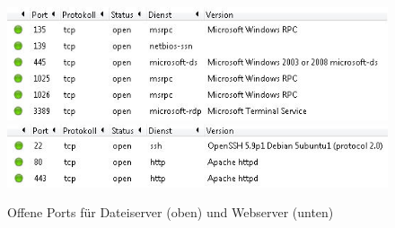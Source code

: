 
\begin{figure}
 \centering
 \includegraphics[width=\textwidth,keepaspectratio=true]{Images/dateiserverports}
 \includegraphics[width=\textwidth,keepaspectratio=true]{Images/webserverports}
 \caption{Offene Ports für Dateiserver (oben) und Webserver (unten)}
 \label{fig:offeneports}
\end{figure}

